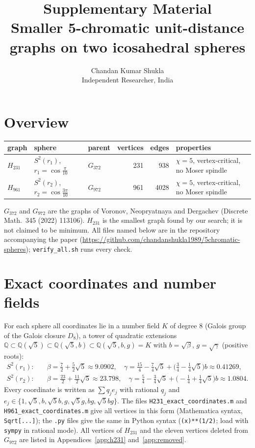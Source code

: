 \documentclass[10pt]{article}
\title{Supplementary Material\\[2pt] \large Smaller 5-chromatic unit-distance graphs on two icosahedral spheres}
\author{Chandan Kumar Shukla\\ {\small Independent Researcher, India}}
\date{}
\begin{document}
\maketitle
\tableofcontents

\section{Overview}
\begin{center}\small
\begin{tabular}{lllrrl}
\toprule
graph & sphere & parent & vertices & edges & properties\\
\midrule
$H_{231}$ & $S^2(r_1)$, $r_1=\cos\frac{\pi}{10}$ & $G_{372}$ & 231 & 938 & $\chi=5$, vertex-critical, no Moser spindle\\
$H_{961}$ & $S^2(r_2)$, $r_2=\cos\frac{3\pi}{10}$ & $G_{972}$ & 961 & 4028 & $\chi=5$, vertex-critical, no Moser spindle\\
\bottomrule
\end{tabular}
\end{center}
$G_{372}$ and $G_{972}$ are the graphs of Voronov, Neopryatnaya and Dergachev (Discrete Math.\ 345 (2022)
113106). $H_{231}$ is the smallest graph found by our search; it is not claimed to be minimum. All files
named below are in the repository accompanying the paper (\url{https://github.com/chandanshukla1989/5chromatic-spheres}); \texttt{verify\_all.sh} runs every check.

\section{Exact coordinates and number fields}
For each sphere all coordinates lie in a number field $K$ of degree $8$ (Galois group of the Galois
closure $D_8$), a tower of quadratic extensions $\mathbb{Q}\subset\mathbb{Q}(\sqrt5)\subset
\mathbb{Q}(\sqrt5,b)\subset\mathbb{Q}(\sqrt5,b,g)=K$ with $b=\sqrt\beta$, $g=\sqrt\gamma$ (positive roots):
\begin{align*}
S^2(r_1):\quad & \beta=\tfrac72+\tfrac52\sqrt5\approx 9.0902,\quad
\gamma=\tfrac{15}{4}-\tfrac74\sqrt5+\bigl(\tfrac34-\tfrac14\sqrt5\bigr)b\approx 0.41269,\\
S^2(r_2):\quad & \beta=\tfrac{23}{2}+\tfrac{11}{2}\sqrt5\approx 23.798,\quad
\gamma=\tfrac54-\tfrac34\sqrt5+\bigl(-\tfrac14+\tfrac14\sqrt5\bigr)b\approx 1.0804.
\end{align*}
Every coordinate is written as $\sum q_j e_j$ with rational $q_j$ and
$e_j\in\{1,\sqrt5,b,\sqrt5 b,g,\sqrt5 g,bg,\sqrt5 bg\}$. The files
\texttt{H231\_exact\_coordinates.m} and \texttt{H961\_exact\_coordinates.m} give all vertices in this form
(Mathematica syntax, \texttt{Sqrt[...]}); the \texttt{.py} files give the same in Python syntax
(\texttt{(x)**(1/2)}; load with \texttt{sympy} in rational mode). All vertices of $H_{231}$ and the
eleven vertices deleted from $G_{972}$ are listed in Appendices~\ref{app:h231} and~\ref{app:removed}.
\end{document}
